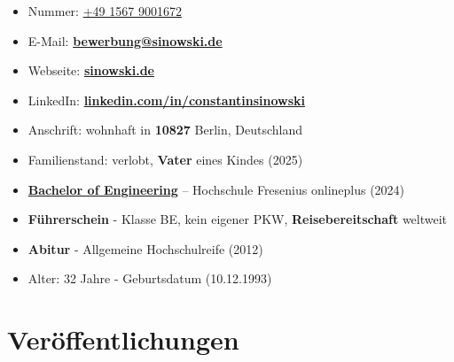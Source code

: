 \documentclass[a4paper,10pt]{article}
\begin{document}
\begin{itemize}
    \item[\faWhatsapp] Nummer: \href{https://wa.me/4915679001672}{+49 1567 9001672}
    \item[\faEnvelope] E-Mail: \textbf{\href{mailto:bewerbung@sinowski.de}{ bewerbung@sinowski.de}}
    \item[\faGlobe] Webseite: \textbf{\href{https://sinowski.de}{sinowski.de}}
    \item[\faLinkedin] LinkedIn: \textbf{\href{https://www.linkedin.com/in/constantinsinowski/}{linkedin.com/in/constantinsinowski}}
    \item[\faMapMarker*] Anschrift: wohnhaft in \textbf{10827} Berlin, Deutschland 
    \item[\faBaby] Familienstand: verlobt, \textbf{Vater} eines Kindes (2025)
    \item[\faGraduationCap] \hyperref[sec:education]{\textbf{{Bachelor of Engineering}}} – Hochschule Fresenius onlineplus (2024)
    \item[\faCar] \textbf{{Führerschein}} - Klasse BE, kein eigener PKW, \textbf{Reisebereitschaft} weltweit
    \item[\faGraduationCap] \textbf{{Abitur}} - Allgemeine Hochschulreife (2012)
    \item[\faBirthdayCake] Alter: 32 Jahre - Geburtsdatum (10.12.1993)
\end{itemize}

\newpage

\section*{Veröffentlichungen} \label{sec:publications}
\end{document}
